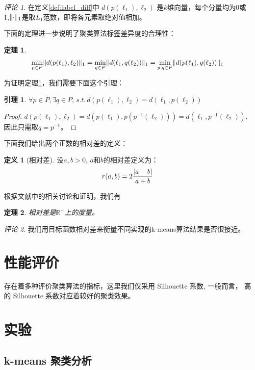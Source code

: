 \documentclass{ctexart}
\DeclarePairedDelimiter\norm{\lVert}{\rVert}
\DeclarePairedDelimiter\abs{\lvert}{\rvert}
\newtheorem{theorem}{定理}
\newtheorem{lemma}{引理}
\theoremstyle{definition}
\newtheorem{definition}{定义}
\theoremstyle{remark}
\newtheorem{remark}{评论}
\begin{document}
\begin{remark}
在定义\ref{def:label_diff}中 $d(p(\ell_1),\ell_2)$ 是$k$维向量，每个分量均为0或1,$\norm{\cdot}_1$是取$L_1$范数，即将各元素取绝对值相加。
\end{remark}


下面的定理进一步说明了聚类算法标签差异度的合理性：
\begin{theorem}\label{thm:12p}
\begin{equation}
\min_{p\in P} \norm{d(p(\ell_1),\ell_2)}_1 = \min_{q\in P} \norm{d(\ell_1,q(\ell_2))}_1 = \min_{p,q\in P} \norm{d(p(\ell_1),q(\ell_2))}_1
\end{equation}
\end{theorem}
为证明定理\ref{thm:12p}，我们需要下面这个引理：
\begin{lemma}
$\forall p\in P, \exists q\in P,\, s.t.\, d(p(\ell_1),\ell_2) = d(\ell_1,p(\ell_2))$
\end{lemma}
\begin{proof}
$ d(p(\ell_1),\ell_2) =  d(p(\ell_1),p(p^{-1}(\ell_2))) = d(\ell_1,p^{-1}(\ell_2))$, 因此只需取$q=p^{-1}$。
\end{proof}
下面我们给出两个正数的相对差的定义：
\begin{definition}[相对差]
设$a,b>0$, $a$和$b$的相对差定义为：
\begin{equation}
r(a,b)= 2\frac{\abs{a-b}}{a+b}
\end{equation}
\end{definition}
根据文献\cite{A_Multiplicative_Metric}中的相关讨论和证明，我们有
\begin{theorem}
相对差是$\mathbb{R}^{+}$上的度量。
\end{theorem}
\begin{remark}
我们用目标函数相对差来衡量不同实现的k-means算法结果是否很接近。
\end{remark}
\section{性能评价}
存在着多种评价聚类算法的指标，这里我们仅采用 Silhouette 系数, 一般而言， 高的 Silhouette 系数对应着较好的聚类效果。

\section{实验}
\subsection{k-means 聚类分析}
\end{document}
